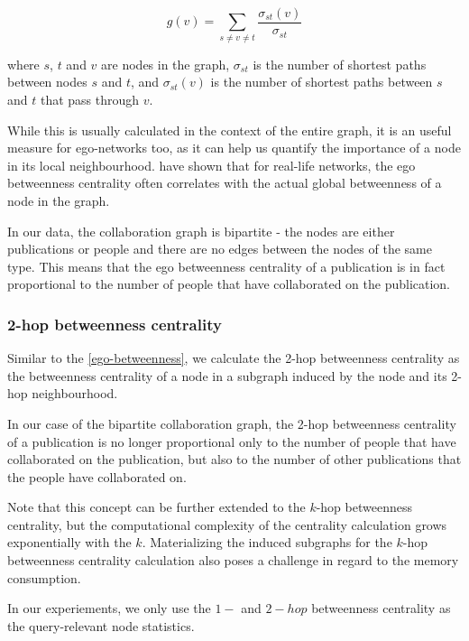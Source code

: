 \[g(v) = \sum_{s \neq v \neq t} \frac{\sigma_{st}(v)}{\sigma_{st}}\]

where $s$, $t$ and $v$ are nodes in the graph, $\sigma_{st}$ is the number of shortest paths between nodes $s$ and $t$, and $\sigma_{st}(v)$ is the number of shortest paths between $s$ and $t$ that pass through $v$.

While this is usually calculated in the context of the entire graph, it is an useful measure for ego-networks too, as it can help us quantify the importance of a node in its local neighbourhood. 
\cite{egonetworkbetweenness} have shown that for real-life networks, the ego betweenness centrality often correlates with the actual global betweenness of a node in the graph.

In our data, the collaboration graph is bipartite - the nodes are either publications or people and there are no edges between the nodes of the same type.
This means that the ego betweenness centrality of a publication is in fact proportional to the number of people that have collaborated on the publication.

\subsubsection{2-hop betweenness centrality}
Similar to the \ref{ego-betweenness}, we calculate the 2-hop betweenness centrality as the betweenness centrality of a node 
in a subgraph induced by the node and its 2-hop neighbourhood.

In our case of the bipartite collaboration graph, the 2-hop betweenness centrality of a publication is no longer proportional only to the number of people that have collaborated on the publication,
but also to the number of other publications that the people have collaborated on.

Note that this concept can be further extended to the $k$-hop betweenness centrality, but the computational complexity of the centrality calculation grows exponentially with the $k$.
Materializing the induced subgraphs for the $k$-hop betweenness centrality calculation also poses a challenge in regard to the memory consumption. 

In our experiements, we only use the $1-$ and $2-hop$ betweenness centrality as the query-relevant node statistics.